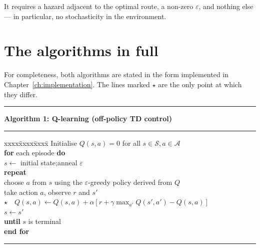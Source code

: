  It requires a hazard adjacent to the optimal route, a
non-zero $\varepsilon$, and nothing else --- in particular, no stochasticity in the environment.


\section{The algorithms in full}

For completeness, both algorithms are stated in the form implemented in
Chapter~\ref{ch:implementation}. The lines marked $\star$ are the only point at which they differ.

\vspace{6pt}
\noindent\begin{minipage}{\textwidth}
\hrule
\vspace{4pt}
\textbf{Algorithm 1: Q-learning (off-policy TD control)}
\vspace{2pt}
\hrule
\vspace{4pt}
{\small
\begin{tabbing}
xxxx\=xxxx\=xxxx\=\kill
Initialise $Q(s,a) = 0$ for all $s \in \mathcal{S}, a \in \mathcal{A}$ \\
\textbf{for} each episode \textbf{do} \\
\> $s \leftarrow$ initial state;\quad anneal $\varepsilon$ \\
\> \textbf{repeat} \\
\>\> choose $a$ from $s$ using the $\varepsilon$-greedy policy derived from $Q$ \\
\>\> take action $a$, observe $r$ and $s'$ \\
\>\> $\star$\ \ $Q(s,a) \leftarrow Q(s,a) + \alpha\left[r + \gamma \max_{a'} Q(s',a') - Q(s,a)\right]$ \\
\>\> $s \leftarrow s'$ \\
\> \textbf{until} $s$ is terminal \\
\textbf{end for}
\end{tabbing}}
\hrule
\end{minipage}

